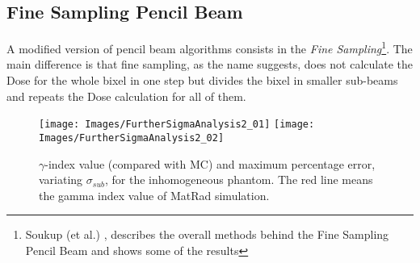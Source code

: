 \documentclass[12pt, a4paper, twoside]{book}
\begin{document}
\subsection{Fine Sampling Pencil Beam}
A modified version of pencil beam algorithms consists in the \emph{Fine Sampling}\footnote{Soukup (et al.) \cite{souk:pba}, describes the overall methods behind the Fine Sampling Pencil Beam and shows some of the results}.
The main difference is that fine sampling, as the name suggests, does not calculate the Dose for the whole bixel in one step but divides the bixel in smaller sub-beams and repeats the Dose calculation for all of them. 
\begin{figure}[t]
{\texttt{[image: Images/FurtherSigmaAnalysis2\_01]}}
{\texttt{[image: Images/FurtherSigmaAnalysis2\_02]}}
\caption{$\gamma$-index value (compared with MC) and maximum percentage error, variating $\sigma_{sub}$, for the inhomogeneous phantom. The red line means the gamma index value of MatRad simulation.}
\label{fig:sigsub}
\end{figure}
\end{document}
